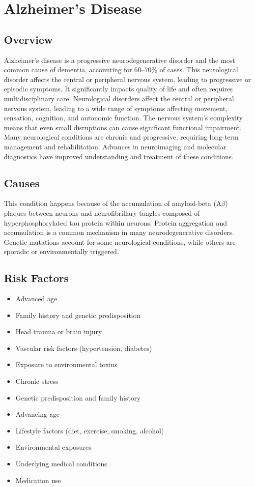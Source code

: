 \chapter{Alzheimer's Disease}
\label{sec:Alzheimer's Disease}

\section{Overview}
Alzheimer's disease is a progressive neurodegenerative disorder and the most common cause of dementia, accounting for 60--70\% of cases. This neurological disorder affects the central or peripheral nervous system, leading to progressive or episodic symptoms. It significantly impacts quality of life and often requires multidisciplinary care. Neurological disorders affect the central or peripheral nervous system, leading to a wide range of symptoms affecting movement, sensation, cognition, and autonomic function. The nervous system's complexity means that even small disruptions can cause significant functional impairment. Many neurological conditions are chronic and progressive, requiring long-term management and rehabilitation. Advances in neuroimaging and molecular diagnostics have improved understanding and treatment of these conditions.
\section{Causes}
This condition happens because of the accumulation of amyloid-beta (A$\beta$) plaques between neurons and neurofibrillary tangles composed of hyperphosphorylated tau protein within neurons.    Protein aggregation and accumulation is a common mechanism in many neurodegenerative disorders.  Genetic mutations account for some neurological conditions, while others are sporadic or environmentally triggered.   
\section{Risk Factors}

\begin{itemize}[noitemsep]
  \item Advanced age
  \item Family history and genetic predisposition
  \item Head trauma or brain injury
  \item Vascular risk factors (hypertension, diabetes)
  \item Exposure to environmental toxins
  \item Chronic stress
  \item Genetic predisposition and family history
  \item Advancing age
  \item Lifestyle factors (diet, exercise, smoking, alcohol)
  \item Environmental exposures
  \item Underlying medical conditions
  \item Medication use
\end{itemize}
